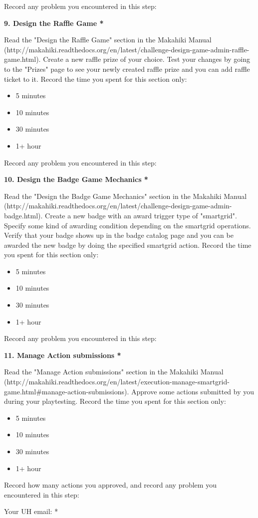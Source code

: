 Record any problem you encountered in this step:

{\bf 9. Design the Raffle Game *}

Read the "Design the Raffle Game" section in the Makahiki Manual (http://makahiki.readthedocs.org/en/latest/challenge-design-game-admin-raffle-game.html). Create a new raffle prize of your choice. Test your changes by going to the "Prizes" page to see your newly created raffle prize and you can add raffle ticket to it. Record the time you spent for this section only:

\begin{itemize}
\item 5 minutes
\item  10 minutes
\item  30 minutes
\item  1+ hour
\end{itemize}


Record any problem you encountered in this step:

{\bf 10. Design the Badge Game Mechanics *}

Read the "Design the Badge Game Mechanics" section in the Makahiki Manual (http://makahiki.readthedocs.org/en/latest/challenge-design-game-admin-badge.html). Create a new badge with an award trigger type of "smartgrid". Specify some kind of awarding condition depending on the smartgrid operations. Verify that your badge shows up in the badge catalog page and you can be awarded the new badge by doing the specified smartgrid action. Record the time you spent for this section only:

\begin{itemize}
\item 5 minutes
\item  10 minutes
\item  30 minutes
\item  1+ hour
\end{itemize}


Record any problem you encountered in this step:

{\bf 11. Manage Action submissions *}

Read the "Manage Action submissions" section in the Makahiki Manual (http://makahiki.readthedocs.org/en/latest/execution-manage-smartgrid-game.html\#manage-action-submissions). Approve some actions submitted by you during your playtesting. Record the time you spent for this section only:

\begin{itemize}
\item 5 minutes
\item  10 minutes
\item  30 minutes
\item  1+ hour
\end{itemize}


Record how many actions you approved, and record any problem you encountered in this step:

Your UH email: *

